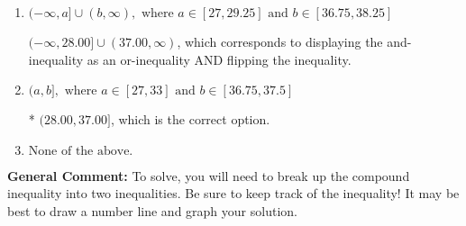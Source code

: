 \documentclass{extbook}[14pt]
\begin{document}
\begin{enumerate}
{\begin{enumerate}[label=\Alph*.]
$(-\infty, 28.00) \cup [37.00, \infty)$, which corresponds to displaying the and-inequality as an or-inequality.
\item \( (-\infty, a] \cup (b, \infty), \text{ where } a \in [27, 29.25] \text{ and } b \in [36.75, 38.25] \)

$(-\infty, 28.00] \cup (37.00, \infty)$, which corresponds to displaying the and-inequality as an or-inequality AND flipping the inequality.
\item \( (a, b], \text{ where } a \in [27, 33] \text{ and } b \in [36.75, 37.5] \)

* $(28.00, 37.00]$, which is the correct option.
\item \( \text{None of the above.} \)


\end{enumerate}

\textbf{General Comment:} To solve, you will need to break up the compound inequality into two inequalities. Be sure to keep track of the inequality! It may be best to draw a number line and graph your solution.
}
\end{enumerate}
\end{document}

